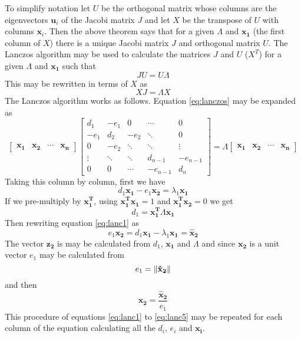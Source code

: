 \documentclass{mbd_fullpaper}
\begin{document}
To simplify notation let $U$ be the orthogonal matrix whose columns are the eigenvectors $\mathbf{u}_i$ of the Jacobi matrix $J$ and let $X$ be the transpose of $U$ with columns $\mathbf{x}_i$.
Then the above theorem says that for a given $\Lambda$ and $\mathbf{x_1}$ (the first column of $X$) there is a unique Jacobi matrix $J$ and orthogonal matrix $U$.
The Lanczos algorithm may be used to calculate the matrices $J$ and $U$ ($X^T$) for a given $\Lambda$ and $\mathbf{x_1}$ such that 
\begin{equation}
J U = U \Lambda
\end{equation}
This may be rewritten in terms of $X$ as
\begin{equation}
X J = \Lambda X
\label{eq:lanczos}
\end{equation}
The Lanczos algorithm works as follows.
Equation \ref{eq:lanczos} may be expanded as
\begin{equation}
\begin{bmatrix} \mathbf{x_1} &  \mathbf{x_2} & \cdots & \mathbf{x_n} \end{bmatrix}
\begin{bmatrix} d_1  &  -e_1 & 0 & \cdots & 0 \\
-e_1 & d_2  & -e_2 & \ddots & 0 \\
0 & -e_2 & \ddots & \ddots & \vdots \\
\vdots & \ddots & \ddots & d_{n-1} & -e_{n-1} \\
0 & 0 & \cdots & -e_{n-1} & d_n \end{bmatrix}
=
\Lambda
\begin{bmatrix} \mathbf{x_1} &  \mathbf{x_2} & \cdots & \mathbf{x_n} \end{bmatrix}
\end{equation}
Taking this column by column, first we have
\begin{equation}
d_1 \mathbf{x_1} - e_1 \mathbf{x_2} = \lambda_1 \mathbf{x_1}
\label{eq:lanc1}
\end{equation}
If we pre-multiply by $\mathbf{x_1^T}$, using $\mathbf{x_1^T} \mathbf{x_1}=1$ and $\mathbf{x_1^T} \mathbf{x_2}=0$ we get
\begin{equation}
d_1 = \mathbf{x_1^T} \Lambda \mathbf{x_1}
\label{eq:lanc2} 
\end{equation}
Then rewriting equation \ref{eq:lanc1} as
\begin{equation}
e_1 \mathbf{x_2} = d_1 \mathbf{x_1} - \lambda_1 \mathbf{x_1} = \mathbf{\hat{x}_2}
\label{eq:lanc3}
\end{equation}
The vector $\mathbf{z_2}$ is may be calculated from $d_1$, $\mathbf{x_1}$ and $\Lambda$ and since $\mathbf{x_2}$ is a unit vector $e_1$ may be calculated from
\begin{equation}
e_1 = \left\lVert\mathbf{\hat{x}_2}\right\rVert
\label{eq:lanc4}
\end{equation}
and then
\begin{equation}
\mathbf{x_2} = \frac{\mathbf{\hat{x}_2}}{e_1}
\label{eq:lanc5}
\end{equation}
This procedure of equations \ref{eq:lanc1} to \ref{eq:lanc5} may be repeated for each column of the equation calculating all the $d_i$, $e_i$ and $\mathbf{x_i}$.
\end{document}
